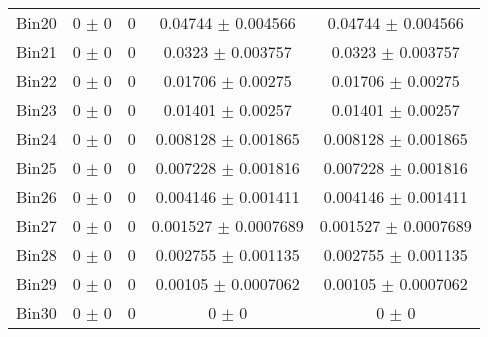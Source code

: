 \begin{tabular}{@{\extracolsep{4pt}}lcccc@{}}
     Bin20 & 0 $\pm$ 0 & 0 & 0.04744 $\pm$ 0.004566 & 0.04744 $\pm$ 0.004566 \\ 
     Bin21 & 0 $\pm$ 0 & 0 & 0.0323 $\pm$ 0.003757 & 0.0323 $\pm$ 0.003757 \\ 
     Bin22 & 0 $\pm$ 0 & 0 & 0.01706 $\pm$ 0.00275 & 0.01706 $\pm$ 0.00275 \\ 
     Bin23 & 0 $\pm$ 0 & 0 & 0.01401 $\pm$ 0.00257 & 0.01401 $\pm$ 0.00257 \\ 
     Bin24 & 0 $\pm$ 0 & 0 & 0.008128 $\pm$ 0.001865 & 0.008128 $\pm$ 0.001865 \\ 
     Bin25 & 0 $\pm$ 0 & 0 & 0.007228 $\pm$ 0.001816 & 0.007228 $\pm$ 0.001816 \\ 
     Bin26 & 0 $\pm$ 0 & 0 & 0.004146 $\pm$ 0.001411 & 0.004146 $\pm$ 0.001411 \\ 
     Bin27 & 0 $\pm$ 0 & 0 & 0.001527 $\pm$ 0.0007689 & 0.001527 $\pm$ 0.0007689 \\ 
     Bin28 & 0 $\pm$ 0 & 0 & 0.002755 $\pm$ 0.001135 & 0.002755 $\pm$ 0.001135 \\ 
     Bin29 & 0 $\pm$ 0 & 0 & 0.00105 $\pm$ 0.0007062 & 0.00105 $\pm$ 0.0007062 \\ 
     Bin30 & 0 $\pm$ 0 & 0 & 0 $\pm$ 0 & 0 $\pm$ 0 \\ 
\hline\hline
  \end{tabular}

